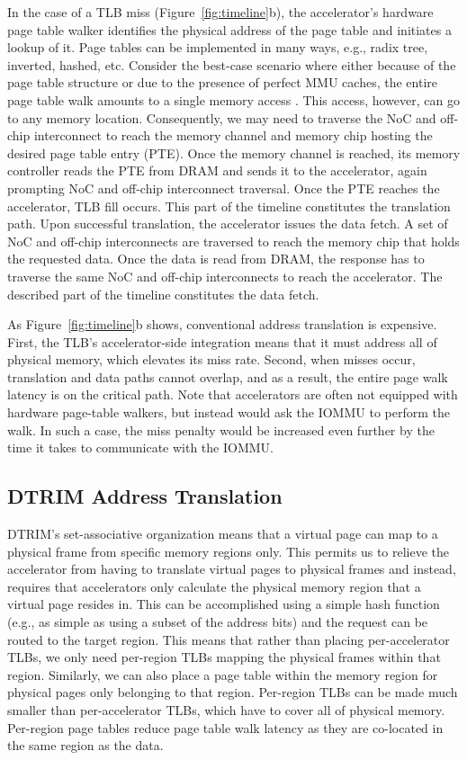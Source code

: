In the case of a TLB miss (Figure~\ref{fig:timeline}b), the
accelerator's hardware page table walker identifies the physical
address of the page table and initiates a lookup of it. Page tables
can be implemented in many ways, e.g., radix tree, inverted, hashed,
etc. Consider the best-case scenario where either because of the page
table structure or due to the presence of perfect MMU caches, the
entire page table walk amounts to a single memory access
\cite{bhattacharjee:large-reach, barr:translation}. This access,
however, can go to any memory location. Consequently, we may need to
traverse the NoC and off-chip interconnect to reach the memory channel
and memory chip hosting the desired page table entry (PTE). Once the
memory channel is reached, its memory controller reads the PTE from
DRAM and sends it to the accelerator, again prompting NoC and off-chip
interconnect traversal. Once the PTE reaches the accelerator, TLB fill
occurs. This part of the timeline constitutes the translation
path. Upon successful translation, the accelerator issues the data
fetch. A set of NoC and off-chip interconnects are traversed to reach
the memory chip that holds the requested data. Once the data is read
from DRAM, the response has to traverse the same NoC and off-chip
interconnects to reach the accelerator. The described part of the
timeline constitutes the data fetch.

As Figure~\ref{fig:timeline}b shows, conventional address
translation is expensive. First, the TLB's accelerator-side
integration means that it must address all of physical memory, which
elevates its miss rate. Second, when misses occur,
translation and data paths cannot overlap, and as a result, the entire page walk
latency is on the critical path. Note that accelerators are often not equipped with hardware page-table walkers, but instead would
ask the IOMMU to perform the walk. In such a case, the miss penalty would be increased even further by the time it takes to communicate with the IOMMU.

\subsection{DTRIM Address Translation}
DTRIM's set-associative organization means that a virtual page can
map to a physical frame from specific memory regions only. This
permits us to relieve the accelerator from having to translate virtual
pages to physical frames and instead, requires that accelerators only
calculate the physical memory region that a virtual page resides in. 
This can be accomplished using a simple hash function (e.g., as simple as using
a subset of the address bits) and the request can be routed to the target region. This means that rather than
placing per-accelerator TLBs, we only need per-region TLBs mapping the
physical frames within that region. Similarly, we can also place a
page table within the memory region for physical pages only belonging
to that region. Per-region TLBs can be made much smaller than
per-accelerator TLBs, which have to cover all of physical
memory. Per-region page tables reduce page table walk latency as
they are co-located in the same region as the data.

